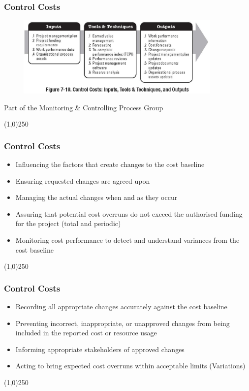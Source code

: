 \begin{frame}
\frametitle{Control Costs}
\begin{figure}
	\centering
		\includegraphics[width = 10cm]{images/Fig7-10.jpg}
	\label{fig:Fig7-10}
\end{figure}
Part of the Monitoring \& Controlling Process Group
\end{frame}
\begin{center}\line(1,0){250}\end{center}







\begin{frame}
\frametitle{Control Costs}
\begin{itemize}
	\item Influencing the factors that create changes to the cost baseline
	\item Ensuring requested changes are agreed upon
	\item Managing the actual changes when and as they occur
	\item Assuring that potential cost overruns do not exceed the authorised funding for the project (total and periodic)
	\item Monitoring cost performance to detect and understand variances from the cost baseline
	\end{itemize}
\end{frame}
\begin{center}\line(1,0){250}\end{center}



\begin{frame}
\frametitle{Control Costs}
\begin{itemize}
	\item Recording all appropriate changes accurately against the cost baseline
	\item Preventing incorrect, inappropriate, or unapproved changes from being included in the reported cost or resource usage
	\item Informing appropriate stakeholders of approved changes
	\item Acting to bring expected cost overruns within acceptable limits (Variations)
\end{itemize}
\end{frame}
\begin{center}\line(1,0){250}\end{center}



